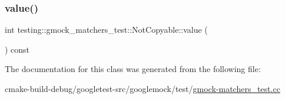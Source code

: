 \subsubsection{\texorpdfstring{value()}{value()}}
{\footnotesize\ttfamily int testing\+::gmock\+\_\+matchers\+\_\+test\+::\+Not\+Copyable\+::value (\begin{DoxyParamCaption}{ }\end{DoxyParamCaption}) const\hspace{0.3cm}{\ttfamily [inline]}}



The documentation for this class was generated from the following file\+:\begin{DoxyCompactItemize}
\item 
cmake-\/build-\/debug/googletest-\/src/googlemock/test/\mbox{\hyperlink{gmock-matchers__test_8cc}{gmock-\/matchers\+\_\+test.\+cc}}\end{DoxyCompactItemize}
